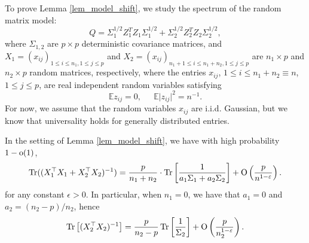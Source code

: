 \bigskip
To prove Lemma \ref{lem_model_shift}, we study the spectrum of the random matrix model:
$$Q= \Sigma_1^{1/2}  Z_1^T Z_1 \Sigma_1^{1/2}  + \Sigma_2^{1/2}  Z_2^T Z_2 \Sigma_2^{1/2} ,$$
where $\Sigma_{1,2}$ are $p\times p$ deterministic covariance matrices, and $X_1=(x_{ij})_{1\le i \le n_1, 1\le j \le p}$ and $X_2=(x_{ij})_{n_1+1\le i \le n_1+n_2, 1\le j \le p}$ are $n_1\times p$ and $n_2 \times p$ random matrices, respectively, where the entries $x_{ij}$, $1 \leq i \leq n_1+n_2\equiv n$, $1 \leq j \leq p$, are real independent random variables satisfying
\begin{equation}\label{eq_12moment} %
\mathbb{E} z_{ij} =0, \ \quad \ \mathbb{E} \vert z_{ij} \vert^2  = n^{-1}.
\end{equation} 
For now, we assume that the random variables $x_{ij}$ are i.i.d. Gaussian, but we know that universality holds for generally distributed entries. %


\begin{lemma}
	In the setting of Lemma \ref{lem_model_shift}, we have with high probability $1-{\rm o}(1)$,
\begin{align*}
\operatorname{Tr} ((X_1^{\top}X_1 + X_2^{\top}X_2)^{-1}) = \frac{p}{n_1+n_2}\cdot \operatorname{Tr} \left[ \frac{1}{a_1\Sigma_1 + a_2\Sigma_2} \right] +\operatorname{O}\left(\frac{p}{n^{1-\varepsilon}}\right).
\end{align*}
	for any constant $\epsilon>0$. %
	In particular, when $n_1 = 0$, we have that $a_1 = 0$ and $a_2 = (n_2-p) / n_2$, hence
	\[ \operatorname{Tr}\left[(X_2^{\top}X_2)^{-1}\right] = \frac{p}{n_2-p}\operatorname{Tr}\left[\frac 1 {\Sigma_2}\right] + \operatorname{O}\left(\frac{p}{n_2^{1-\varepsilon}}\right). \]
\end{lemma}

